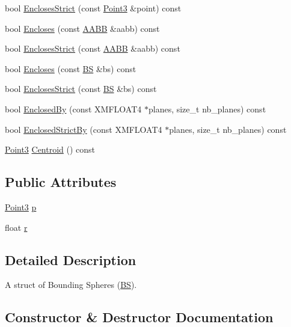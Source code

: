\begin{DoxyCompactItemize}
\item 
bool \hyperlink{structmage_1_1_b_s_ad08a02ebf76d2b3a5903c9c69a0e80e1}{Encloses\+Strict} (const \hyperlink{structmage_1_1_point3}{Point3} \&point) const
\item 
bool \hyperlink{structmage_1_1_b_s_af6139a592c9d95ae0f1162a9f2e485d1}{Encloses} (const \hyperlink{structmage_1_1_a_a_b_b}{A\+A\+BB} \&aabb) const
\item 
bool \hyperlink{structmage_1_1_b_s_a2114f30ef1fd41b0fdeab31c24a66b7a}{Encloses\+Strict} (const \hyperlink{structmage_1_1_a_a_b_b}{A\+A\+BB} \&aabb) const
\item 
bool \hyperlink{structmage_1_1_b_s_a60a9ed7cca1ffb815c43eafa7f5093b6}{Encloses} (const \hyperlink{structmage_1_1_b_s}{BS} \&bs) const
\item 
bool \hyperlink{structmage_1_1_b_s_ad1b81567c640283bd5355073dd0bf226}{Encloses\+Strict} (const \hyperlink{structmage_1_1_b_s}{BS} \&bs) const
\item 
bool \hyperlink{structmage_1_1_b_s_afa01cd31b15b2decdf5a3c5333e4c260}{Enclosed\+By} (const X\+M\+F\+L\+O\+A\+T4 $\ast$planes, size\+\_\+t nb\+\_\+planes) const
\item 
bool \hyperlink{structmage_1_1_b_s_ae4355ffb0d3f5109ad6ee2bea00a6eb9}{Enclosed\+Strict\+By} (const X\+M\+F\+L\+O\+A\+T4 $\ast$planes, size\+\_\+t nb\+\_\+planes) const
\item 
\hyperlink{structmage_1_1_point3}{Point3} \hyperlink{structmage_1_1_b_s_a0709a2c2d2a175da0d6e53eda480fce1}{Centroid} () const
\end{DoxyCompactItemize}
\subsection*{Public Attributes}
\begin{DoxyCompactItemize}
\item 
\hyperlink{structmage_1_1_point3}{Point3} \hyperlink{structmage_1_1_b_s_a9c6ad8f37fa6b98179e8108c8584fdcf}{p}
\item 
float \hyperlink{structmage_1_1_b_s_ab2e786e8493feb28a3bc0216e8dea5bc}{r}
\end{DoxyCompactItemize}


\subsection{Detailed Description}
A struct of Bounding Spheres (\hyperlink{structmage_1_1_b_s}{BS}). 

\subsection{Constructor \& Destructor Documentation}
\hypertarget{structmage_1_1_b_s_aa34921d9ea23b9a724ddf739b3adabfa}{}\label{structmage_1_1_b_s_aa34921d9ea23b9a724ddf739b3adabfa} 
